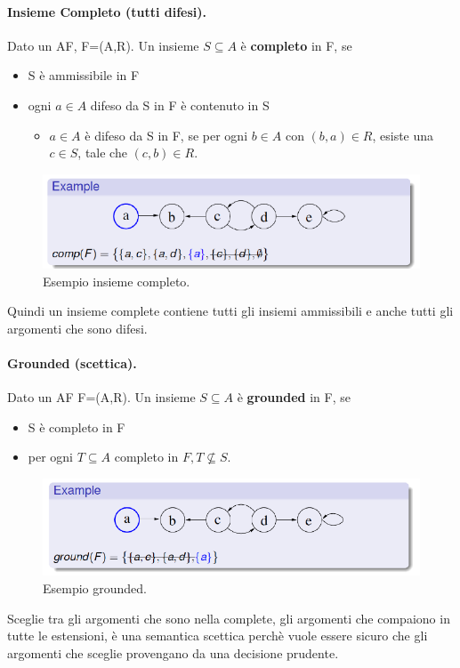 \paragraph{Insieme Completo (tutti difesi).} Dato un AF, F=(A,R). Un insieme $S \subseteq A$ è \textbf{completo} in F, se 
\begin{itemize}
    \item S è ammissibile in F
    \item ogni $a\in A$ difeso da S in F è contenuto in S
    \begin{itemize}
        \item $a\in A$ è difeso da S in F, se per ogni $b\in A$ con $(b,a) \in R$, esiste una $c\in S$, tale che $(c,b)\in R$.
    \end{itemize}
\end{itemize}
\begin{figure}[H]
    \centering
    \includegraphics[width=13cm, keepaspectratio]{img/es_set_complete.png}
    \caption{Esempio insieme completo.}\label{fig:es_insieme_completo}
\end{figure}
Quindi un insieme complete contiene tutti gli insiemi ammissibili e anche tutti gli argomenti che sono difesi.

\paragraph{Grounded (scettica).} Dato un AF F=(A,R). Un insieme $S \subseteq A$ è \textbf{grounded} in F, se 
\begin{itemize}
    \item S è completo in F
    \item per ogni $T \subseteq A$ completo in $F,T \nsubseteq  S$.
\end{itemize}

\begin{figure}[H]
    \centering
    \includegraphics[width=13cm, keepaspectratio]{img/es_grounded.png}
    \caption{Esempio grounded.}\label{fig:es_insieme_grounded}
\end{figure}
Sceglie tra gli argomenti che sono nella complete, gli argomenti che compaiono in tutte le estensioni, è una semantica scettica perchè vuole essere sicuro che gli argomenti che sceglie provengano da una decisione prudente. 

